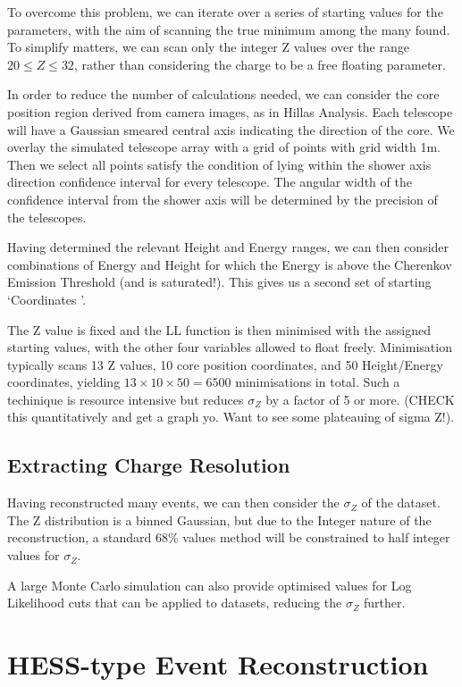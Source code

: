 \documentclass{article}
\begin{document}
To overcome this problem, we can iterate over a series of starting values for the parameters, with the aim of scanning the true minimum among the many found. To simplify matters, we can scan only the integer Z values over the range $ 20 \leq Z \leq 32 $, rather than considering the charge to be a free floating parameter.

In order to reduce the number of calculations needed, we can consider the core position region derived from camera images, as in Hillas Analysis. Each telescope will have a Gaussian smeared central axis indicating the direction of the core. We overlay the simulated telescope array with a grid of points with grid width 1m. Then we select all points satisfy the condition of lying within the shower axis direction confidence interval for every telescope. The angular width of the confidence interval from the shower axis will be determined by the precision of the telescopes.

Having determined the relevant Height and Energy ranges, we can then consider combinations of Energy and Height for which the Energy is above the Cherenkov Emission Threshold (and is saturated!). This gives us a second set of starting \textquoteleft Coordinates \textquoteright.

The Z value is fixed and the LL function is then minimised with the assigned starting values, with the other four variables allowed to float freely. Minimisation typically scans 13 Z values, 10 core position coordinates, and 50 Height/Energy coordinates, yielding $ 13 \times 10 \times 50 = 6500$ minimisations in total. Such a techinique is resource intensive but reduces $\sigma_{Z}$ by a factor of 5 or more. (CHECK this quantitatively and get a graph yo. Want to see some plateauing of sigma Z!).

\subsection{Extracting Charge Resolution}

Having reconstructed many events, we can then consider the $\sigma_{Z}$ of the dataset. The Z distribution is a binned Gaussian, but due to the Integer nature of the reconstruction, a standard 68\% values method will be constrained to half integer values for $\sigma_{Z}$.

A large Monte Carlo simulation can also provide optimised values for Log Likelihood cuts that can be applied to datasets, reducing the $\sigma_{Z}$ further.

\section{HESS-type Event Reconstruction}
\end{document}
